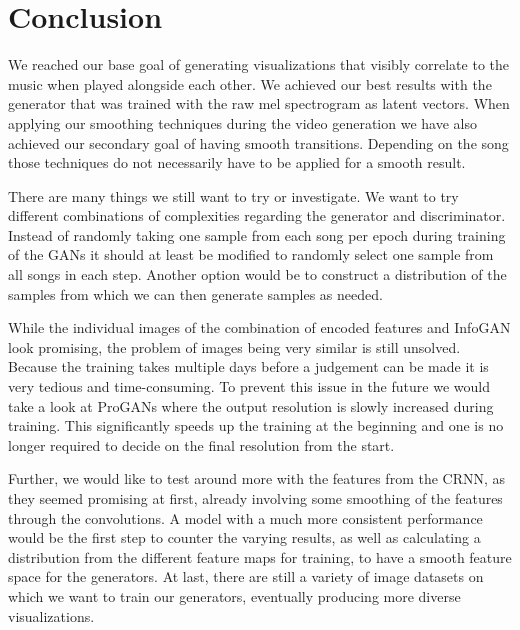 \chapter{Conclusion}

    We reached our base goal of generating visualizations that visibly correlate to the music when played alongside each other. We achieved our best results with the generator that was trained with the raw mel spectrogram as latent vectors. When applying our smoothing techniques during the video generation we have also achieved our secondary goal of having smooth transitions. Depending on the song those techniques do not necessarily have to be applied for a smooth result.

    There are many things we still want to try or investigate. We want to try different combinations of complexities regarding the generator and discriminator. Instead of randomly taking one sample from each song per epoch during training of the GANs it should at least be modified to randomly select one sample from all songs in each step. Another option would be to construct a distribution of the samples from which we can then generate samples as needed.
    
    While the individual images of the combination of encoded features and InfoGAN look promising, the problem of images being very similar is still unsolved. Because the training takes multiple days before a judgement can be made it is very tedious and time-consuming. To prevent this issue in the future we would take a look at ProGANs where the output resolution is slowly increased during training. This significantly speeds up the training at the beginning and one is no longer required to decide on the final resolution from the start.

    Further, we would like to test around more with the features from the CRNN, as they seemed promising at first, already involving some smoothing of the features through the convolutions. A model with a much more consistent performance would be the first step to counter the varying results, as well as calculating a distribution from the different feature maps for training, to have a smooth feature space for the generators. At last, there are still a variety of image datasets on which we want to train our generators, eventually producing more diverse visualizations.